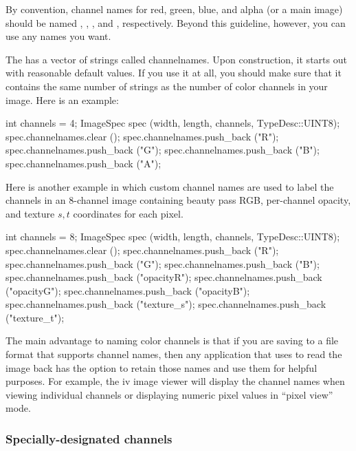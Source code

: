 By convention, channel names for red, green, blue, and alpha (or a main
image) should be named , , , and ,
respectively.  Beyond this guideline, however, you can use any names you
want.

The \ImageSpec has a vector of strings called {\cf
  channelnames}.  Upon construction, it starts out with reasonable
default values.  If you use it
at all, you should make sure that it contains the same number of strings
as the number of color channels in your image.  Here is an example:

\begin{code}
        int channels = 4;
        ImageSpec spec (width, length, channels, TypeDesc::UINT8);
        spec.channelnames.clear ();
        spec.channelnames.push_back ("R");
        spec.channelnames.push_back ("G");
        spec.channelnames.push_back ("B");
        spec.channelnames.push_back ("A");
\end{code}

Here is another example in which custom channel names are used to 
label the channels in an 8-channel image containing beauty pass
RGB, per-channel opacity, and texture $s,t$ coordinates for each pixel.

\begin{code}
        int channels = 8;
        ImageSpec spec (width, length, channels, TypeDesc::UINT8);
        spec.channelnames.clear ();
        spec.channelnames.push_back ("R");
        spec.channelnames.push_back ("G");
        spec.channelnames.push_back ("B");
        spec.channelnames.push_back ("opacityR");
        spec.channelnames.push_back ("opacityG");
        spec.channelnames.push_back ("opacityB");
        spec.channelnames.push_back ("texture_s");
        spec.channelnames.push_back ("texture_t");
\end{code}

The main advantage to naming color channels is that if you are saving to
a file format that supports channel names, then any application that
uses \product to read the image back has the option to retain those
names and use them for helpful purposes.  For example, the {\cf iv}
image viewer will display the channel names when viewing individual
channels or displaying numeric pixel values in ``pixel view'' mode.


\subsubsection{Specially-designated channels}

